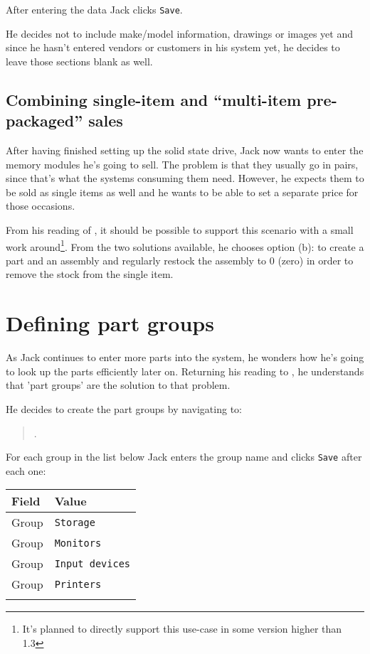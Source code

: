 After entering the data Jack clicks \texttt{Save}.

He decides not to include make/model information, drawings or images yet and since
he hasn't entered vendors or customers in his system yet, he decides to leave
those sections blank as well.

\subsection{Combining single-item and ``multi-item pre-packaged'' sales}
\label{subsec-stock-parts-mulit-item}

After having finished setting up the solid state drive, Jack now wants to enter
the memory modules he's going to sell. The problem is that they usually go in pairs,
since that's what the systems consuming them need. However, he expects them to be sold
as single items as well and he wants to be able to set a separate price for those occasions.

From his reading of , it should be
possible to support this scenario with a small work around\footnote{It's planned to directly
support this use-case in some version higher than 1.3}. From the two solutions available,
he chooses option (b): to create a part and an assembly and regularly restock the assembly
to 0 (zero) in order to remove the stock from the single item.

\section{Defining part groups}
\label{sec-stock-part-groups}

As Jack continues to enter more parts into the system, he wonders how he's going to
look up the parts efficiently later on. Returning his reading to ,
he understands that 'part groups' are the solution to that problem. 

He decides to create
the part groups by navigating to:
\begin{quote}
.
\end{quote}
For each group in the list below Jack enters the group name and clicks \texttt{Save} after each one:

\begin{tabular}{ll}
Field & Value \\ \hline
Group & \texttt{Storage}\\
Group & \texttt{Monitors}\\
Group & \texttt{Input devices}\\
Group & \texttt{Printers}\\
\\
\end{tabular}

